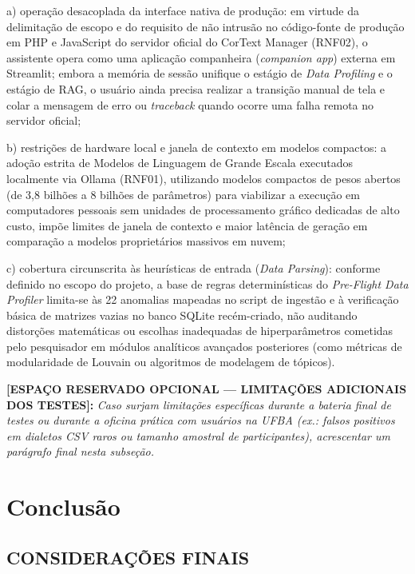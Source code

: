 \documentclass[
	oneside,
	a4paper,
	12pt,
	chapter=TITLE,
	section=TITLE,
	english,
	brazilian
]{abntex2}
\begin{document}
\par\indent a) operação desacoplada da interface nativa de produção: em virtude da delimitação de escopo e do requisito de não intrusão no código-fonte de produção em PHP e JavaScript do servidor oficial do CorText Manager (RNF02), o assistente opera como uma aplicação companheira (\textit{companion app}) externa em Streamlit; embora a memória de sessão unifique o estágio de \textit{Data Profiling} e o estágio de RAG, o usuário ainda precisa realizar a transição manual de tela e colar a mensagem de erro ou \textit{traceback} quando ocorre uma falha remota no servidor oficial;
\par\indent b) restrições de hardware local e janela de contexto em modelos compactos: a adoção estrita de Modelos de Linguagem de Grande Escala executados localmente via Ollama (RNF01), utilizando modelos compactos de pesos abertos (de 3,8 bilhões a 8 bilhões de parâmetros) para viabilizar a execução em computadores pessoais sem unidades de processamento gráfico dedicadas de alto custo, impõe limites de janela de contexto e maior latência de geração em comparação a modelos proprietários massivos em nuvem;
\par\indent c) cobertura circunscrita às heurísticas de entrada (\textit{Data Parsing}): conforme definido no escopo do projeto, a base de regras determinísticas do \textit{Pre-Flight Data Profiler} limita-se às 22 anomalias mapeadas no script de ingestão e à verificação básica de matrizes vazias no banco SQLite recém-criado, não auditando distorções matemáticas ou escolhas inadequadas de hiperparâmetros cometidas pelo pesquisador em módulos analíticos avançados posteriores (como métricas de modularidade de Louvain ou algoritmos de modelagem de tópicos).

\begin{citacao}
\textbf{[ESPAÇO RESERVADO OPCIONAL — LIMITAÇÕES ADICIONAIS DOS TESTES]:} \textit{Caso surjam limitações específicas durante a bateria final de testes ou durante a oficina prática com usuários na UFBA (ex.: falsos positivos em dialetos CSV raros ou tamanho amostral de participantes), acrescentar um parágrafo final nesta subseção.}
\end{citacao}


\chapter{Conclusão}\label{sec:conclusao}


\FloatBarrier
\section{CONSIDERAÇÕES FINAIS}\label{sec:consideracoes_finais}
\end{document}

